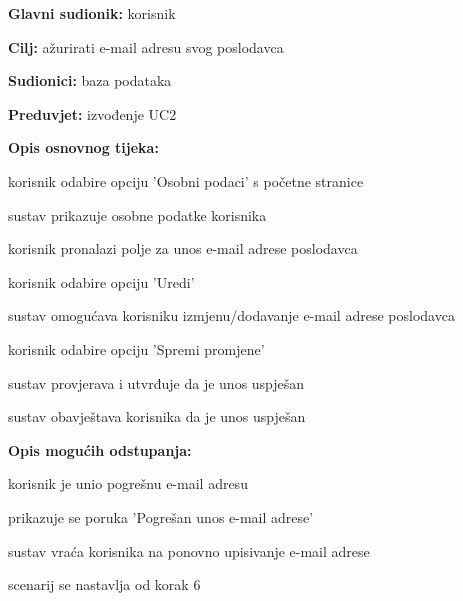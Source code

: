 					\noindent {}
					\begin{packed_item}
	
						\item \textbf{Glavni sudionik: }korisnik
						\item  \textbf{Cilj:} ažurirati e-mail adresu svog poslodavca
						\item  \textbf{Sudionici:} baza podataka
						\item  \textbf{Preduvjet:} izvođenje UC2
						\item  \textbf{Opis osnovnog tijeka:}
						
						\item[] \begin{packed_enum}
	
							\item korisnik odabire opciju 'Osobni podaci' s početne stranice
							\item sustav prikazuje osobne podatke korisnika 
							\item korisnik pronalazi polje za unos e-mail adrese poslodavca
							\item korisnik odabire opciju 'Uredi'
							\item sustav omogućava korisniku izmjenu/dodavanje e-mail adrese poslodavca
							\item korisnik odabire opciju 'Spremi promjene'
							\item sustav provjerava i utvrđuje da je unos uspješan
							\item sustav obavještava korisnika da je unos uspješan
			
						\end{packed_enum}
						
						\item  \textbf{Opis mogućih odstupanja:}
						
						\item[] \begin{packed_item}
							\item[7.a] korisnik je unio pogrešnu e-mail adresu 
							\item[] 
							\begin{packed_enum} 
								\item prikazuje se poruka 'Pogrešan unos e-mail adrese'
								\item sustav vraća korisnika na ponovno upisivanje e-mail adrese
								\item scenarij se nastavlja od korak 6
								
							\end{packed_enum}
						\end{packed_item}
						
					\end{packed_item}

